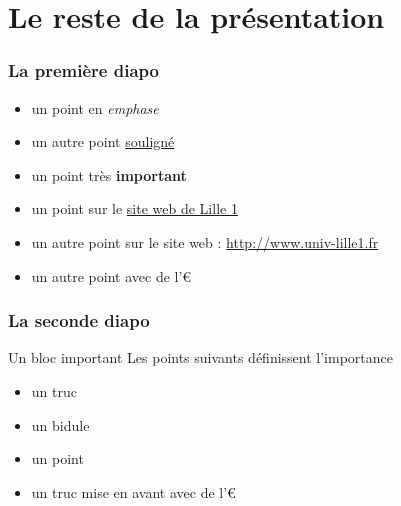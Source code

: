 \documentclass[10pt,t]{beamer}
\begin{document}

\section{Le reste de la présentation}


\begin{frame}
  \frametitle{La première diapo}
  
  
  \begin{itemize}
  \item un point en \emph{emphase}
  \item un autre point \underline{souligné}
  \item un point très \textbf{important}
  \end{itemize} 
  
  \pause  
  
  
  \begin{itemize}
  \item un point sur le \href{http://www.univ-lille1.fr}{site web de Lille 1}
  \item un autre point sur le site web : \url{http://www.univ-lille1.fr}
  \item un autre point avec de l'€
  \end{itemize} 
\end{frame}


\begin{frame}
  \frametitle{La seconde diapo}
  
  
  \begin{block}{Un bloc important}
    Les points suivants définissent l'importance
    \begin{itemize}
    \item un truc
    \item un bidule
    \end{itemize}
  \end{block}
  
  \pause  
  
  
  \begin{itemize}
  \item un point
  \item un truc mise en \alert{avant} avec de l'€
  \end{itemize} 
\end{frame}

\end{document}
